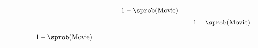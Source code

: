 \begin{table}[]
\begin{tabular}{lllllllllll}
                          &                           &                   &                                                               &                                                                                                                 &                           &                                                             &                                                                            & \cellcolor[HTML]{FC8D59}$1 - \sprob(\text{Movie})$                                       &                                        &                                                                                                                 \\
                          &                           &                   &                                                               &                                                                                                                 &                           &                                                             &                                                                            &                                                                                          &                                        & \cellcolor[HTML]{FC8D59}$1 - \sprob(\text{Movie})$                                                              \\
                          &                           &                   & \cellcolor[HTML]{FC8D59}{}    &                                                                                                                 &                           &                                                             &                                                                            &                                                                                          &                                        &                                                                                                                 \\
                          &                           &                   &                                                               & \cellcolor[HTML]{FC8D59}$1 - \sprob(\text{Movie})$                                                              &                           &                                                             &                                                                            &                                                                                          &                                        &                                                                                                                 \\

\end{tabular}
\end{table}
